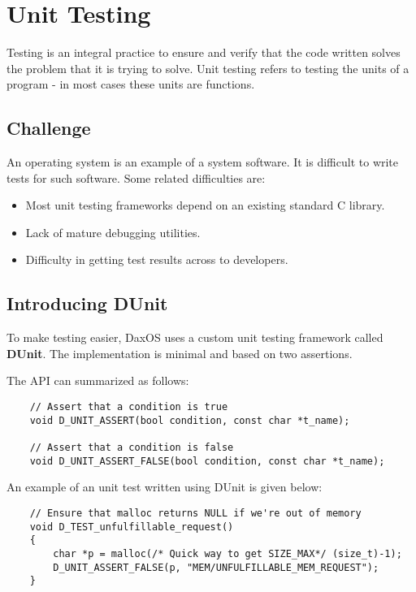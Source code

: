 \chapter{Unit Testing}\label{chapter:Unit Testing}

Testing is an integral practice to ensure and verify that the code written solves the problem that it is trying to solve.
Unit testing refers to testing the units of a program - in most cases these units are functions.

\section{Challenge}\label{section:Challenge}

An operating system is an example of a system software. It is difficult to write tests for such software.
Some related difficulties are:

\begin{itemize}
    \item Most unit testing frameworks depend on an existing standard C library.
    \item Lack of mature debugging utilities. 
    \item Difficulty in getting test results across to developers.
\end{itemize}

\section{Introducing DUnit}\label{section:Introducing DUnit}

To make testing easier, DaxOS uses a custom unit testing framework called \textbf{DUnit}.
The implementation is minimal and based on two assertions.
\pagebreak

The API can summarized as follows:

\vspace{0.5cm}
\begin{lstlisting}
    // Assert that a condition is true
    void D_UNIT_ASSERT(bool condition, const char *t_name);

    // Assert that a condition is false
    void D_UNIT_ASSERT_FALSE(bool condition, const char *t_name);
\end{lstlisting}
\vspace{1cm}

An example of an unit test written using DUnit is given below:
\vspace{0.5cm}
\begin{lstlisting}
    // Ensure that malloc returns NULL if we're out of memory
    void D_TEST_unfulfillable_request()
    {
        char *p = malloc(/* Quick way to get SIZE_MAX*/ (size_t)-1);
        D_UNIT_ASSERT_FALSE(p, "MEM/UNFULFILLABLE_MEM_REQUEST");
    }
\end{lstlisting}